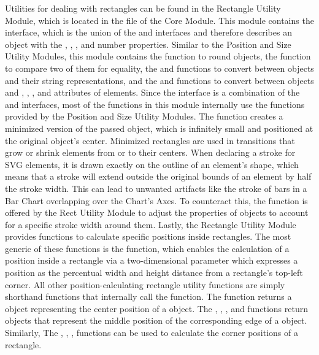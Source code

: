 Utilities for dealing with rectangles can be found in the Rectangle
Utility Module, which is located in the  file
of the Core Module.  This module contains the  interface,
which is the union of the  and  interfaces
and therefore describes an object with the , ,
, and  number properties.  Similar to the
Position and Size Utility Modules, this module contains the
 function to round  objects, the
 function to compare two of them for equality, the
 and  functions to convert
between  objects and their string representations, and the
 and  functions to convert
between objects and , , , and
 attributes of elements.  Since the  interface
is a combination of the  and  interfaces,
most of the functions in this module internally use the functions
provided by the Position and Size Utility Modules.  The
 function creates a minimized version of the
passed  object, which is infinitely small and positioned at
the original  object's center.  Minimized rectangles are
used in transitions that grow or shrink  elements from or
to their centers.  When declaring a stroke for SVG elements, it is
drawn exactly on the outline of an element's shape, which means that a
stroke will extend outside the original bounds of an element by half
the stroke width.  This can lead to unwanted artifacts like the stroke
of bars in a Bar Chart overlapping over the Chart's Axes.  To
counteract this, the  function is offered by the
Rect Utility Module to adjust the properties of  objects to
account for a specific stroke width around them.  Lastly, the
Rectangle Utility Module provides functions to calculate specific
positions inside rectangles. The most generic of these functions is
the  function, which enables the calculation of a
position inside a rectangle via a two-dimensional parameter which
expresses a position as the percentual width and height distance from a
rectangle's top-left corner. All other position-calculating rectangle
utility functions are simply shorthand functions that internally call
the  function.  The  function
returns a  object representing the center position of a
 object.  The , ,
, and  functions return 
objects that represent the middle position of the corresponding edge
of a  object.  Similarly, The ,
, , 
functions can be used to calculate the corner positions of a
rectangle.

